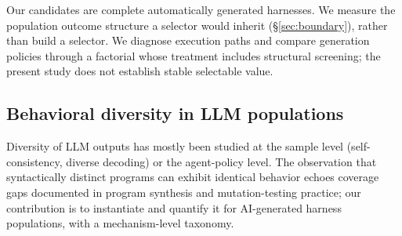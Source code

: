 Our candidates are complete automatically generated harnesses. We measure
the population outcome structure a selector would inherit
(\S\ref{sec:boundary}), rather than build a selector. We diagnose execution
paths and compare generation policies through a factorial whose treatment
includes structural screening; the present study does not establish stable
selectable value.

\subsection{Behavioral diversity in LLM populations}\label{related:diversity}
Diversity of LLM outputs has mostly been studied at the sample level
(self-consistency, diverse decoding) or the agent-policy level. The
observation that syntactically distinct programs can exhibit identical
behavior echoes coverage gaps documented in program synthesis and
mutation-testing practice; our contribution is to instantiate and quantify
it for AI-generated harness populations, with a mechanism-level taxonomy.
